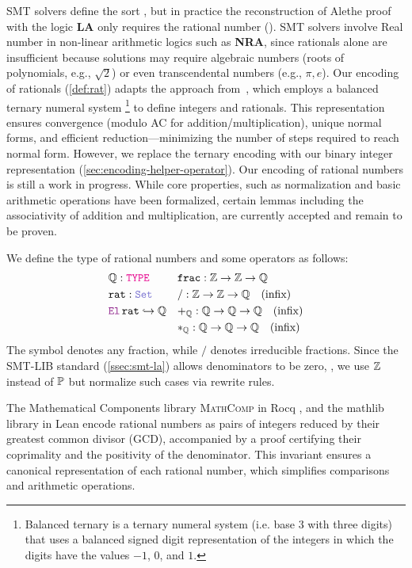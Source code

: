 SMT solvers define the sort , but in practice the reconstruction of Alethe proof with the logic \uppercase{\textbf{LA}} only requires the rational number (\Q).
SMT solvers involve Real number in non-linear arithmetic logics such as \uppercase{\textbf{NRA}}, since rationals alone are insufficient because solutions may require algebraic numbers (roots of polynomials, e.g., $\sqrt{2}$) or even transcendental numbers (e.g., $\pi, e$).
Our encoding of rationals (\cref{def:rat}) adapts the approach from~\cite{frac-rw}, which employs a balanced ternary numeral system
\footnote{Balanced ternary is a ternary numeral system (i.e. base $3$ with three digits) that uses a balanced signed digit representation of the integers in which the digits have the values $-1$, $0$, and $1$.}
to define integers and rationals.
This representation ensures convergence (modulo AC for addition/multiplication), unique normal forms, and efficient reduction—minimizing the number of steps required to reach normal form.
However, we replace the ternary encoding with our binary integer representation (\cref{sec:encoding-helper-operator}).
Our encoding of rational numbers is still a work in progress.
While core properties, such as normalization and basic arithmetic operations have been formalized, certain lemmas including the associativity of addition and multiplication, are currently accepted and remain to be proven.

\begin{definition}[Rational]\label{def:rat}
We define the type of rational numbers and some operators as follows:
\begin{align*}
& \Q: \type            & &\kw{frac}: \Z \ra \Z \ra \Q \\
& \kw{rat}: \set       & &\slash: \Z \ra \Z \ra \Q \quad \text{(infix)} \\
& \el\,\kw{rat} \re \Q & &+_\Q : \Q \ra \Q \ra \Q \quad \text{(infix)}\\
&                      & &*_\Q : \Q \ra \Q \ra \Q \quad \text{(infix)}\\
\end{align*}
The symbol  denotes any fraction, while $\slash$ denotes irreducible fractions.
Since the SMT-LIB standard (\cref{ssec:smt-la}) allows denominators to be zero, , we use $\mathbb{Z}$ instead of $\mathbb{P}$ but normalize such cases via rewrite rules.
\end{definition}

The Mathematical Components library \textsc{MathComp} \cite{mathcomp}  in Rocq \cite{Rocq-refman}, and the mathlib library \cite{mathlib} in Lean \cite{lean4:2021} encode rational numbers as pairs of integers reduced by their greatest common divisor (GCD), accompanied by a proof certifying their coprimality and the positivity of the denominator.
This invariant ensures a canonical representation of each rational number, which simplifies comparisons and arithmetic operations.

